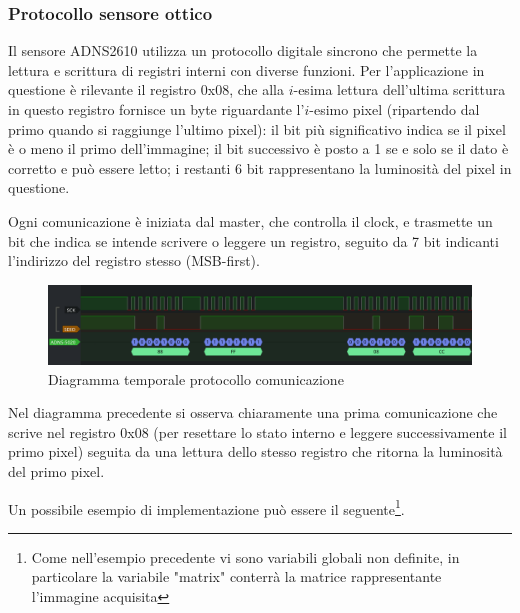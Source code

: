\documentclass[12pt]{article}
\begin{document}
        \newpage
        \subsubsection{Protocollo sensore ottico}\label{adns2610_protocol}
        
        Il sensore ADNS2610 utilizza un protocollo digitale sincrono che permette la lettura e scrittura di registri interni con diverse funzioni. Per l'applicazione in questione è rilevante il registro 0x08, che alla $i$-esima lettura dell'ultima scrittura in questo registro fornisce un byte riguardante l'$i$-esimo pixel (ripartendo dal primo quando si raggiunge l'ultimo pixel): il bit più significativo  indica se il pixel è o meno il primo dell'immagine; il bit successivo è posto a 1 se e solo se il dato è corretto e può essere letto; i restanti 6 bit rappresentano la luminosità del pixel in questione.
        
        Ogni comunicazione è iniziata dal master, che controlla il clock, e trasmette un bit che indica se intende scrivere o leggere un registro, seguito da 7 bit indicanti l'indirizzo del registro stesso (MSB-first).
        
        \begin{figure}[h]
        \centering
            \includegraphics[width=\textwidth]{Draws/Logic_analyzer_ADNS2610.png}
            \caption{Diagramma temporale protocollo comunicazione}
        \end{figure}
        
        Nel diagramma precedente si osserva chiaramente una prima comunicazione che scrive nel registro 0x08 (per resettare lo stato interno e leggere successivamente il primo pixel) seguita da una lettura dello stesso registro che ritorna la luminosità del primo pixel.
      
        \vspace{2cm}
        Un possibile esempio di implementazione può essere il seguente\footnote{Come nell'esempio precedente vi sono variabili globali non definite, in particolare la variabile "matrix" conterrà la matrice rappresentante l'immagine acquisita}.
        
\end{document}
